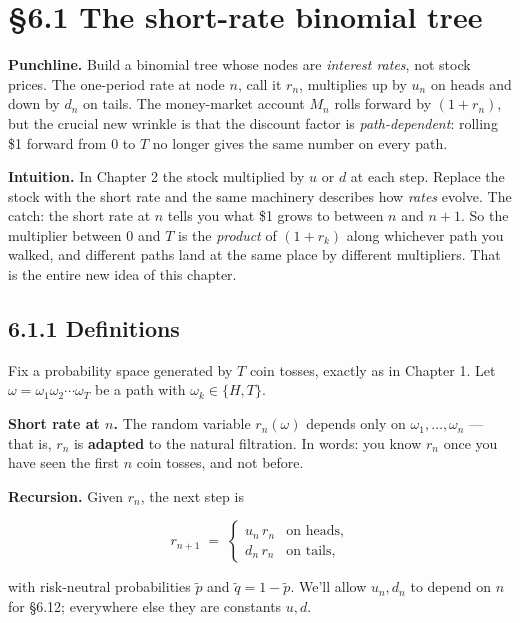 \documentclass[
  10pt,
  twoside]{book}
\begin{document}
\section{§6.1 The short-rate binomial
tree}\label{the-short-rate-binomial-tree}

\textbf{Punchline.} Build a binomial tree whose nodes are \emph{interest
rates}, not stock prices. The one-period rate at node \(n\), call it
\(r_n\), multiplies up by \(u_n\) on heads and down by \(d_n\) on tails.
The money-market account \(M_n\) rolls forward by \((1 + r_n)\), but the
crucial new wrinkle is that the discount factor is
\emph{path-dependent}: rolling \$1 forward from \(0\) to \(T\) no longer
gives the same number on every path.

\textbf{Intuition.} In Chapter 2 the stock multiplied by \(u\) or \(d\)
at each step. Replace the stock with the short rate and the same
machinery describes how \emph{rates} evolve. The catch: the short rate
at \(n\) tells you what \$1 grows to between \(n\) and \(n+1\). So the
multiplier between \(0\) and \(T\) is the \emph{product} of
\((1 + r_k)\) along whichever path you walked, and different paths land
at the same place by different multipliers. That is the entire new idea
of this chapter.

\subsection{6.1.1 Definitions}\label{definitions-17}

Fix a probability space generated by \(T\) coin tosses, exactly as in
Chapter 1. Let \(\omega = \omega_1 \omega_2 \cdots \omega_T\) be a path
with \(\omega_k \in \{H, T\}\).

\textbf{Short rate at \(n\).} The random variable \(r_n(\omega)\)
depends only on \(\omega_1, \ldots, \omega_n\) --- that is, \(r_n\) is
\textbf{adapted} to the natural filtration. In words: you know \(r_n\)
once you have seen the first \(n\) coin tosses, and not before.

\textbf{Recursion.} Given \(r_n\), the next step is

\[r_{n+1} \;=\; \begin{cases} u_n \, r_n & \text{on heads,} \\ d_n \, r_n & \text{on tails,} \end{cases}\]

with risk-neutral probabilities \(\tilde p\) and
\(\tilde q = 1 - \tilde p\). We'll allow \(u_n, d_n\) to depend on \(n\)
for §6.12; everywhere else they are constants \(u, d\).
\end{document}
